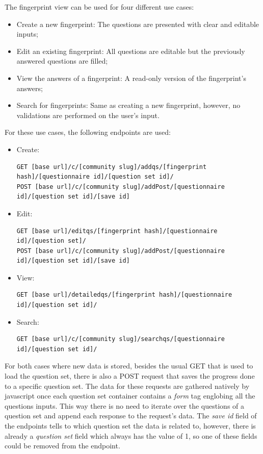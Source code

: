 The fingerprint view can be used for four different use cases:
\begin{itemize}
    \item Create a new fingerprint: The questions are presented with clear and editable inputs;
    \item Edit an existing fingerprint: All questions are editable but the previously answered questions are filled;
    \item View the answers of a fingerprint: A read-only version of the fingerprint's answers;
    \item Search for fingerprints: Same as creating a new fingerprint, however, no validations are performed on the user's input.
\end{itemize}

For these use cases, the following endpoints are used:

\begin{itemize}
    \item Create:
\begin{lstlisting}[basicstyle=\tiny]
GET [base url]/c/[community slug]/addqs/[fingerprint hash]/[questionnaire id]/[question set id]/
POST [base url]/c/[community slug]/addPost/[questionnaire id]/[question set id]/[save id]
\end{lstlisting}
    \item Edit:
\begin{lstlisting}[basicstyle=\tiny]
GET [base url]/editqs/[fingerprint hash]/[questionnaire id]/[question set]/
POST [base url]/c/[community slug]/addPost/[questionnaire id]/[question set id]/[save id]
\end{lstlisting}
    \item View:
\begin{lstlisting}[basicstyle=\tiny]
GET [base url]/detailedqs/[fingerprint hash]/[questionnaire id]/[question set id]/
\end{lstlisting}
    \item Search:
\begin{lstlisting}[basicstyle=\tiny]
GET [base url]/c/[community slug]/searchqs/[questionnaire id]/[question set id]/
\end{lstlisting}
\end{itemize}

For both cases where new data is stored, besides the usual GET that is used to load the question set, there is also a POST request that saves the progress done to a specific question set.
The data for these requests are gathered natively by javascript once each question set container contains a \textit{form} tag englobing all the questions inputs.
This way there is no need to iterate over the questions of a question set and append each response to the request's data.
The \textit{save id} field of the endpoints tells to which question set the data is related to, however, there is already a \textit{question set} field which always has the value of 1, so one of these fields could be removed from the endpoint.

